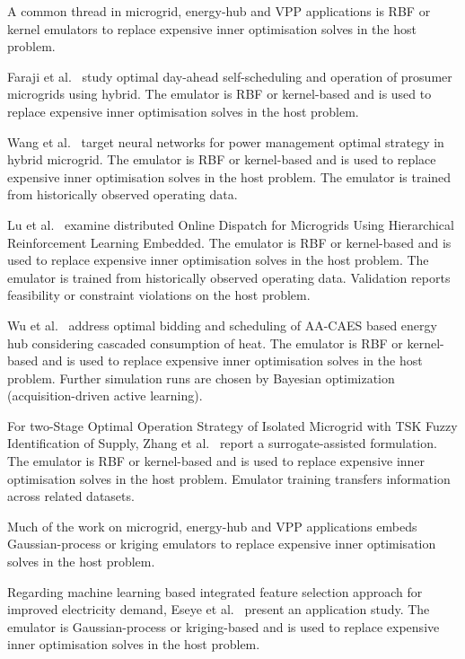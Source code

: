 A common thread in microgrid, energy-hub and VPP applications is RBF or kernel emulators to replace expensive inner optimisation solves in the host problem.

Faraji et al.~\cite{Faraji2020157284} study optimal day-ahead self-scheduling and operation of prosumer microgrids using hybrid. The emulator is RBF or kernel-based and is used to replace expensive inner optimisation solves in the host problem.

Wang et al.~\cite{Wang20192635} target neural networks for power management optimal strategy in hybrid microgrid. The emulator is RBF or kernel-based and is used to replace expensive inner optimisation solves in the host problem. The emulator is trained from historically observed operating data.

Lu et al.~\cite{Lu20232989} examine distributed Online Dispatch for Microgrids Using Hierarchical Reinforcement Learning Embedded. The emulator is RBF or kernel-based and is used to replace expensive inner optimisation solves in the host problem. The emulator is trained from historically observed operating data. Validation reports feasibility or constraint violations on the host problem.

Wu et al.~\cite{Wu2021} address optimal bidding and scheduling of AA-CAES based energy hub considering cascaded consumption of heat. The emulator is RBF or kernel-based and is used to replace expensive inner optimisation solves in the host problem. Further simulation runs are chosen by Bayesian optimization (acquisition-driven active learning).

For two-Stage Optimal Operation Strategy of Isolated Microgrid with TSK Fuzzy Identification of Supply, Zhang et al.~\cite{Zhang20203731} report a surrogate-assisted formulation. The emulator is RBF or kernel-based and is used to replace expensive inner optimisation solves in the host problem. Emulator training transfers information across related datasets.

Much of the work on microgrid, energy-hub and VPP applications embeds Gaussian-process or kriging emulators to replace expensive inner optimisation solves in the host problem.

Regarding machine learning based integrated feature selection approach for improved electricity demand, Eseye et al.~\cite{Eseye201991463} present an application study. The emulator is Gaussian-process or kriging-based and is used to replace expensive inner optimisation solves in the host problem.

